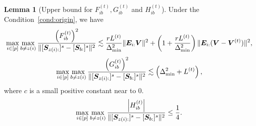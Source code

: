 \documentclass[lettersize,journal]{IEEEtran}
\theoremstyle{definition}
\newtheorem{lem}{Lemma}
\theoremstyle{definition}
\newcommand{\of}[1]{\left(#1\right)}
\newcommand{\aabs}[1]{\left|#1\right|}
\begin{document}
    \begin{lem}[Upper bound for $F_{ib}^{(t)}, G_{ib}^{(t)}$ and $H_{ib}^{(t)}$]\label{lem:upper_fgh} Under the Condition~\ref{cond:origin}, we have 
    \begin{equation}\label{eq:fib}
        \max_{i \in [p]} \max_{b \neq z(i)} \frac{\of{F_{ib}^{(t)}}^2}{ \onormSize{}{ [  \mS_{z(i):} ]^s  -  [ \mS_{b:} ]^s }^2 } \lesssim  \frac{r L^{(t)}}{ \Delta_{\min}^2} \onormSize{}{\mE_{i:} \mV}^2 + \of{1 +  \frac{ r L^{(t)}}{ \Delta_{\min}^2}} \onormSize{}{\mE_{i:} (\mV - \mV^{(t)})}^2 ,
    \end{equation}
    \begin{equation}\label{eq:gib}
        \max_{i \in [p]} \max_{b \neq z(i)} \frac{ \of{  G_{ib}^{(t)} }^2  }{ \onormSize{}{ [\mS_{z(i):} ]^s - [\mS_{b:}]^s }^2}  \lesssim \of{ \Delta_{\min}^2 +L^{(t)}},
    \end{equation}
    where $c$ is a small positive constant near to 0.
    \begin{equation}\label{eq:hib}
        \max_{i \in [p]} \max_{b \neq z(i)}  \frac{ \aabs{  H_{ib}^{(t)} }  }{ \onormSize{}{ [\mS_{z(i):} ]^s - [\mS_{b:}]^s }^2} \leq \frac{1}{4}.
    \end{equation}
    \end{lem}
    
\end{document}
